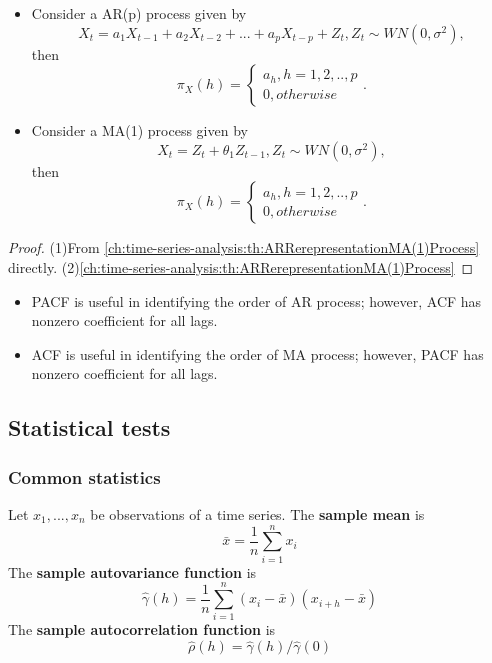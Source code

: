 \begin{lemma}\label{ch:time-series-analysis:th:PACFforARandMA}\hfill
\begin{itemize}
	\item Consider a AR(p) process given by
	$$X_t = a_1 X_{t-1} + a_2 X_{t-2} + ... + a_p X_{t-p} + Z_t, Z_t \sim WN(0, \sigma^2),$$
	then
	$$\pi_X(h) = \begin{cases*}
	a_h, h = 1,2,..,p \\
	0, otherwise
	\end{cases*}.$$
	\item Consider a MA(1) process given by
	$$X_t = Z_t + \theta_1 Z_{t-1}, Z_t \sim WN(0, \sigma^2),$$
	then
	$$\pi_X(h) = \begin{cases*}
	a_h, h = 1,2,..,p \\
	0, otherwise
	\end{cases*}.$$
	
\end{itemize}	
	
\end{lemma}
\begin{proof}
(1)From \autoref{ch:time-series-analysis:th:ARRerepresentationMA(1)Process} directly.
(2)\autoref{ch:time-series-analysis:th:ARRerepresentationMA(1)Process}
\end{proof}

\begin{note}\hfill
\begin{itemize}
	\item PACF is useful in identifying the order of AR process; however, ACF has nonzero coefficient for all lags.
	\item ACF is useful in identifying the order of MA process; however, PACF has nonzero coefficient for all lags.
\end{itemize}	
\end{note}


\subsection{Statistical tests}
\subsubsection{Common statistics}
\begin{definition}
	\cite[19]{brockwell2002introduction} Let $x_1,...,x_n$ be observations of a time series. The \textbf{sample mean} is
	$$\bar{x} = \frac{1}{n}\sum_{i=1}^nx_i$$
	The \textbf{sample autovariance function} is
	$$\hat{\gamma}(h) = \frac{1}{n}\sum_{i=1}^n(x_i-\bar{x})( x_{i+h} - \bar{x})$$
	The \textbf{sample autocorrelation function} is
	$$\hat{\rho}(h)=\hat{\gamma}(h)/\hat{\gamma}(0)$$
\end{definition}


